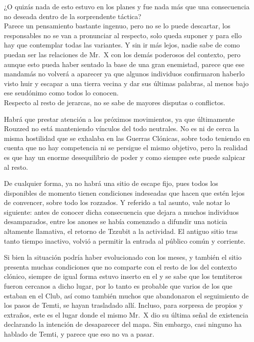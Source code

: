 \documentclass[
  spanish,
]{book}
\begin{document}
¿O quizás nada de esto estuvo en los planes y fue nada más que una consecuencia no deseada dentro de la sorprendente táctica?\\
Parece un pensamiento bastante ingenuo, pero no se lo puede descartar, los responsables no se van a pronunciar al respecto, solo queda suponer y para ello hay que contemplar todas las variantes. Y sin ir más lejos, nadie sabe de como puedan ser las relaciones de Mr.~X con los demás poderosos del contexto, pero aunque esto pueda haber sentado la base de una gran enemistad, parece que ese mandamás no volverá a aparecer ya que algunos individuos confirmaron haberlo visto huir y escapar a una tierra vecina y dar sus últimas palabras, al menos bajo ese seudónimo como todos lo conocen.\\
Respecto al resto de jerarcas, no se sabe de mayores disputas o conflictos.

Habrá que prestar atención a los próximos movimientos, ya que últimamente Rouzzed no está manteniendo vínculos del todo neutrales. No es ni de cerca la misma hostilidad que se exhalaba en las Guerras Clónicas, sobre todo teniendo en cuenta que no hay competencia ni se persigue el mismo objetivo, pero la realidad es que hay un enorme desequilibrio de poder y como siempre este puede salpicar al resto.

De cualquier forma, ya no habrá una sitio de escape fijo, pues todos los disponibles de momento tienen condiciones indeseadas que hacen que estén lejos de convencer, sobre todo los rozzados. Y referido a tal asunto, vale notar lo siguiente: antes de conocer dicha consecuencia que dejara a muchos individuos desamparados, entre los anones se había comenzado a difundir una noticia altamente llamativa, el retorno de Tzzubit a la actividad. El antiguo sitio tras tanto tiempo inactivo, volvió a permitir la entrada al público común y corriente.

Si bien la situación podría haber evolucionado con los meses, y también el sitio presenta muchas condiciones que no comparte con el resto de los del contexto clónico, siempre de igual forma estuvo inserto en el y se sabe que los temtiteros fueron cercanos a dicho lugar, por lo tanto es probable que varios de los que estaban en el Club, así como también muchos que abandonaron el seguimiento de los pasos de Temti, se hayan trasladado allí. Incluso, para sorpresa de propios y extraños, este es el lugar donde el mismo Mr.~X dio su última señal de existencia declarando la intención de desaparecer del mapa. Sin embargo, casi ninguno ha hablado de Temti, y parece que eso no va a pasar.
\end{document}
